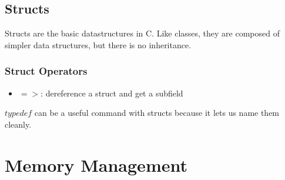 \documentclass{article}
\begin{document}
\subsection{Structs}
Structs are the basic datastructures in C. Like classes, they are composed of simpler data structures,
but there is no inheritance.
\subsubsection{Struct Operators}
\begin{itemize}
    \item $=>$: dereference a struct and get a subfield
\end{itemize}
$typedef$ can be a useful command with structs because it lets us name them cleanly.
\section{Memory Management}
\end{document}
